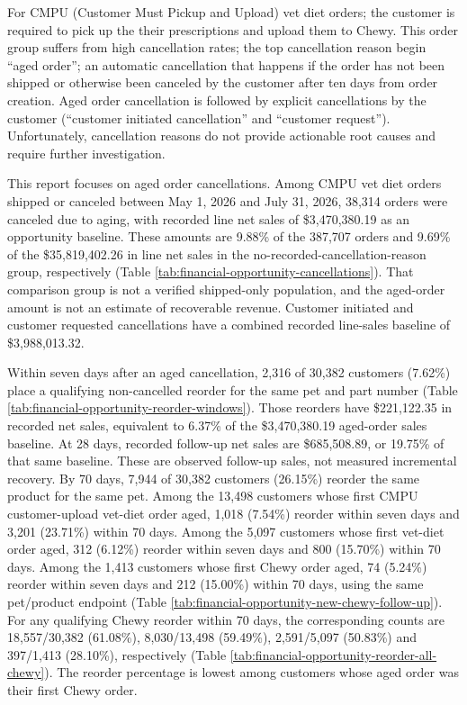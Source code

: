 \label{abstract}

For CMPU (Customer Must Pickup and Upload) vet diet orders; the
customer is required to pick up the their prescriptions and upload
them to Chewy. This order group suffers from high cancellation rates;
the top cancellation reason begin ``aged order''; an automatic
cancellation that happens if the order has not been shipped or
otherwise been canceled by the customer after ten days from order
creation. Aged order cancellation is followed by explicit
cancellations by the customer (``customer initiated cancellation'' and
``customer request''). Unfortunately, cancellation reasons
do not provide actionable root causes and require further
investigation.

This report focuses on aged order cancellations. Among CMPU vet diet
orders shipped or canceled between May 1, 2026 and July 31, 2026,
38,314 orders were canceled due to aging, with recorded line net sales
of \$3,470,380.19 as an opportunity baseline. These amounts are 9.88\%
of the 387,707 orders and 9.69\% of the \$35,819,402.26 in line net sales
in the no-recorded-cancellation-reason group, respectively (Table
\ref{tab:financial-opportunity-cancellations}). That comparison group
is not a verified shipped-only population, and the aged-order amount
is not an estimate of recoverable revenue. Customer initiated and
customer requested cancellations have a combined recorded line-sales
baseline of \$3,988,013.32.

Within seven days after an aged cancellation, 2,316 of 30,382 customers
(7.62\%) place a qualifying non-cancelled reorder for the same pet and
part number (Table \ref{tab:financial-opportunity-reorder-windows}).
Those reorders have \$221,122.35 in recorded net sales, equivalent to
6.37\% of the \$3,470,380.19 aged-order sales baseline. At 28 days,
recorded follow-up net sales are \$685,508.89, or 19.75\% of that same
baseline. These are observed follow-up sales, not measured incremental
recovery. By 70 days, 7,944 of 30,382 customers (26.15\%) reorder the
same product for the same pet.
Among the 13,498 customers whose first CMPU customer-upload vet-diet
order aged, 1,018 (7.54\%) reorder within seven days and 3,201 (23.71\%)
within 70 days. Among the 5,097 customers whose first vet-diet
order aged, 312 (6.12\%) reorder within seven days and 800 (15.70\%)
within 70 days. Among the 1,413 customers whose first Chewy
order aged, 74 (5.24\%) reorder within seven days and 212 (15.00\%)
within 70 days, using the same pet/product
endpoint (Table \ref{tab:financial-opportunity-new-chewy-follow-up}).
For any qualifying Chewy reorder within 70 days, the corresponding
counts are 18,557/30,382 (61.08\%), 8,030/13,498 (59.49\%),
2,591/5,097 (50.83\%) and 397/1,413 (28.10\%), respectively
(Table \ref{tab:financial-opportunity-reorder-all-chewy}).
The reorder percentage is lowest among customers whose aged order was
their first Chewy order.


